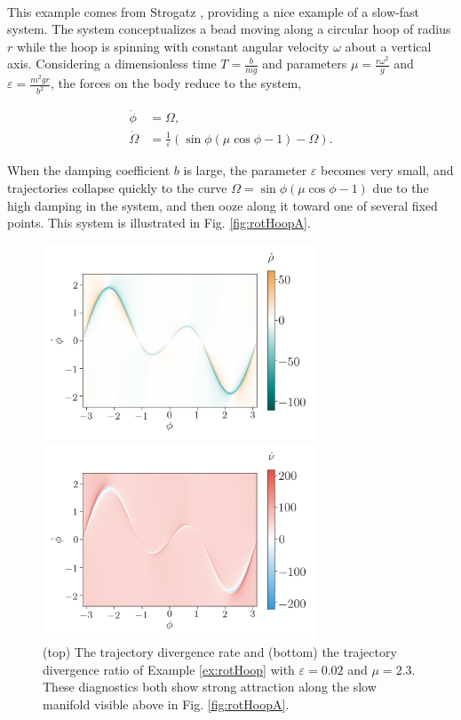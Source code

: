 \documentclass[twocolumn]{svjour3}
\begin{document}
 \\
This example comes from Strogatz \cite[Section 3.5]{strogatz_nonlinear_2014}, providing a nice example of a slow-fast system. The system conceptualizes a bead moving along a circular hoop of radius $r$ while the hoop is spinning with constant angular velocity $\omega$ about a vertical axis. Considering a dimensionless time $T=\tfrac{b}{mg}$ and parameters $\mu=\tfrac{r\omega^2}{g}$ and $\varepsilon=\tfrac{m^2gr}{b^2}$, the forces on the body reduce to the system, 

\begin{equation}
\begin{aligned}
\dot{\phi} & = \Omega, \\
\dot{\Omega } & = \frac{1}{\varepsilon}\left(\sin\phi(\mu\cos\phi - 1) - \Omega\right).
\end{aligned}
\label{eq:rotHoop}
\end{equation}

When the damping coefficient $b$ is large, the parameter $\varepsilon$ becomes very small, and trajectories collapse quickly to the curve $\Omega = \sin\phi (\mu \cos\phi - 1)$ due to the high damping in the system, and then ooze along it toward one of several fixed points. This system is illustrated in Fig. \ref{fig:rotHoopA}.

\begin{figure}
\begin{minipage}{3.2in}
\centering
\includegraphics[width=3.2in]{Fig8}
\end{minipage}
\begin{minipage}{3.2in}
\centering
\includegraphics[width=3.2in]{Fig9}
\end{minipage}
\caption{\label{fig:rotHoopB} (top) The trajectory divergence rate and (bottom) the trajectory divergence ratio of Example \ref{ex:rotHoop} with $\varepsilon = 0.02$ and $\mu = 2.3$. These diagnostics both show strong attraction along the slow manifold visible above in Fig. \ref{fig:rotHoopA}.}
\end{figure}
\end{document}
